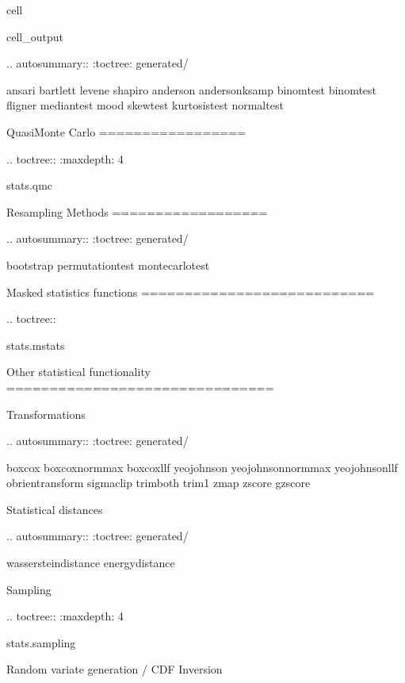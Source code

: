 \documentclass[letterpaper,10pt,english]{jupyterBook}
\begin{document}
\begin{sphinxuseclass}{cell}
\begin{sphinxVerbatimOutput}
\begin{sphinxuseclass}{cell_output}
\begin{sphinxVerbatim}[commandchars=\\\{\}]
.. autosummary::
   :toctree: generated/

   ansari
   bartlett
   levene
   shapiro
   anderson
   anderson\PYGZus{}ksamp
   binom\PYGZus{}test
   binomtest
   fligner
   median\PYGZus{}test
   mood
   skewtest
   kurtosistest
   normaltest


Quasi\PYGZhy{}Monte Carlo
=================

.. toctree::
   :maxdepth: 4

   stats.qmc

Resampling Methods
==================

.. autosummary::
   :toctree: generated/

   bootstrap
   permutation\PYGZus{}test
   monte\PYGZus{}carlo\PYGZus{}test

Masked statistics functions
===========================

.. toctree::

   stats.mstats


Other statistical functionality
===============================

Transformations
\PYGZhy{}\PYGZhy{}\PYGZhy{}\PYGZhy{}\PYGZhy{}\PYGZhy{}\PYGZhy{}\PYGZhy{}\PYGZhy{}\PYGZhy{}\PYGZhy{}\PYGZhy{}\PYGZhy{}\PYGZhy{}\PYGZhy{}

.. autosummary::
   :toctree: generated/

   boxcox
   boxcox\PYGZus{}normmax
   boxcox\PYGZus{}llf
   yeojohnson
   yeojohnson\PYGZus{}normmax
   yeojohnson\PYGZus{}llf
   obrientransform
   sigmaclip
   trimboth
   trim1
   zmap
   zscore
   gzscore

Statistical distances
\PYGZhy{}\PYGZhy{}\PYGZhy{}\PYGZhy{}\PYGZhy{}\PYGZhy{}\PYGZhy{}\PYGZhy{}\PYGZhy{}\PYGZhy{}\PYGZhy{}\PYGZhy{}\PYGZhy{}\PYGZhy{}\PYGZhy{}\PYGZhy{}\PYGZhy{}\PYGZhy{}\PYGZhy{}\PYGZhy{}\PYGZhy{}

.. autosummary::
   :toctree: generated/

   wasserstein\PYGZus{}distance
   energy\PYGZus{}distance

Sampling
\PYGZhy{}\PYGZhy{}\PYGZhy{}\PYGZhy{}\PYGZhy{}\PYGZhy{}\PYGZhy{}\PYGZhy{}

.. toctree::
   :maxdepth: 4

   stats.sampling

Random variate generation / CDF Inversion
\PYGZhy{}\PYGZhy{}\PYGZhy{}\PYGZhy{}\PYGZhy{}\PYGZhy{}\PYGZhy{}\PYGZhy{}\PYGZhy{}\PYGZhy{}\PYGZhy{}\PYGZhy{}\PYGZhy{}\PYGZhy{}\PYGZhy{}\PYGZhy{}\PYGZhy{}\PYGZhy{}\PYGZhy{}\PYGZhy{}\PYGZhy{}\PYGZhy{}\PYGZhy{}\PYGZhy{}\PYGZhy{}\PYGZhy{}\PYGZhy{}\PYGZhy{}\PYGZhy{}\PYGZhy{}\PYGZhy{}\PYGZhy{}\PYGZhy{}\PYGZhy{}\PYGZhy{}\PYGZhy{}\PYGZhy{}\PYGZhy{}\PYGZhy{}\PYGZhy{}\PYGZhy{}


\end{sphinxVerbatim}
\end{sphinxuseclass}
\end{sphinxVerbatimOutput}
\end{sphinxuseclass}
\end{document}
